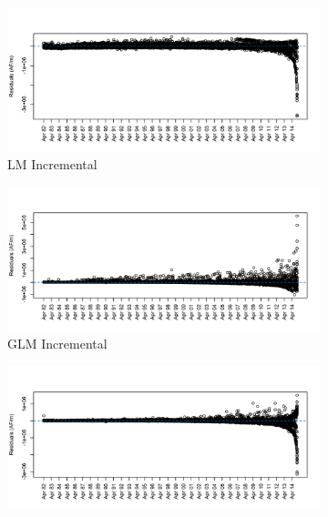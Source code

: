 \begin{figure}
	\centering
	\begin{subfigure}{.5\textwidth}
  		\centering
 		 \includegraphics[width=\textwidth, trim={0 0 0 1cm}, clip=true]{plots/rplot22_lmlogo_residovertime_inc.png}
  		\caption{LM Incremental}
  		\label{fig:restimelm}
	\end{subfigure}%
	\begin{subfigure}{.5\textwidth}
  		\centering
 		 \includegraphics[width=\textwidth, trim={0 0 0 1cm}, clip=true]{plots/rplot22_glmlogo_residovertime_inc.png}
  		\caption{GLM Incremental}
  		\label{fig:restimeglm}
	\end{subfigure}%
	\hfill
	\begin{subfigure}{.5\textwidth}
  		\centering
 		 \includegraphics[width=\textwidth, trim={0 0 0 1cm}, clip=true]{plots/rplot22_rflogo_residovertime_inc.png}

\end{subfigure}
\end{figure}
